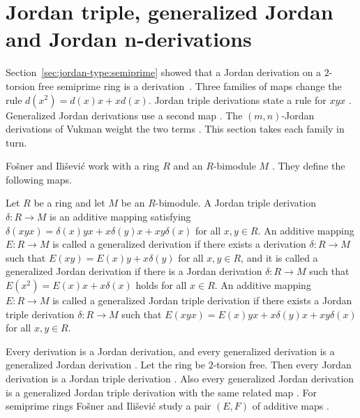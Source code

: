 \section{Jordan triple, generalized Jordan and Jordan n-derivations}\label{sec:jordan-type:triple-and-generalized}

Section~\ref{sec:jordan-type:semiprime} showed that a Jordan derivation on a
$2$-torsion free semiprime ring is a derivation~\cite[p.~1881]{MajeedOzel2014}. Three families of maps change
the rule $d(x^{2})=d(x)x+xd(x)$. Jordan triple derivations state a rule for
$xyx$ \cite[p.~416]{FosnerIlisevic2008}. Generalized Jordan derivations use a
second map \cite[p.~1]{FerreiraGuzzoFerreira2020}. The $(m,n)$-Jordan
derivations of Vukman weight the two terms \cite[p.~1881]{MajeedOzel2014}.
This section takes each family in turn.

Fošner and Ilišević work with a ring $R$ and an $R$-bimodule $M$
\cite[p.~416]{FosnerIlisevic2008}. They define the following maps.

\begin{definition}\label{def:jordan:triple-generalized}
Let $R$ be a ring and let $M$ be an $R$-bimodule. A Jordan triple derivation $\delta\colon R\to M$
is an additive mapping satisfying $\delta(xyx)=\delta(x)yx+x\delta(y)x+xy\delta(x)$ for all
$x,y\in R$. An additive mapping $E\colon R\to M$ is called a generalized derivation if there
exists a derivation $\delta\colon R\to M$ such that $E(xy)=E(x)y+x\delta(y)$ for all $x,y\in R$,
and it is called a generalized Jordan derivation if there is a Jordan derivation
$\delta\colon R\to M$ such that $E(x^{2})=E(x)x+x\delta(x)$ holds for all $x\in R$. An additive
mapping $E\colon R\to M$ is called a generalized Jordan triple derivation if there exists a
Jordan triple derivation $\delta\colon R\to M$ such that
$E(xyx)=E(x)yx+x\delta(y)x+xy\delta(x)$ for all $x,y\in R$.
\end{definition}

Every derivation is a Jordan derivation, and every generalized derivation is a
generalized Jordan derivation \cite[p.~416]{FosnerIlisevic2008}. Let the ring
be $2$-torsion free. Then every Jordan derivation is a Jordan triple
derivation \cite[p.~416]{FosnerIlisevic2008}. Also every generalized Jordan
derivation is a generalized Jordan triple derivation with the same related map
\cite[p.~416]{FosnerIlisevic2008}. For semiprime rings Fošner and Ilišević
study a pair $(E,F)$ of additive maps \cite[p.~423]{FosnerIlisevic2008}.

